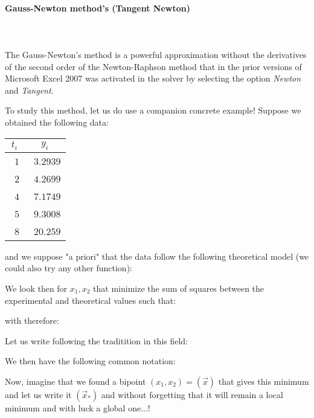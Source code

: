	\paragraph{Gauss-Newton method's (Tangent Newton)}\mbox{}\\\\
	The Gauss-Newton's method is a powerful approximation without the derivatives of the second order of the Newton-Raphson method that in the prior versions of Microsoft Excel 2007 was activated in the solver by selecting the option \textit{Newton} and \textit{Tangent}.

	To study this method, let us do use a companion concrete example! Suppose we obtained the following data:
	\begin{table}[H]
		\begin{center}
				\begin{tabular}{|p{2cm}|p{2cm}|}
					\hline
					\multicolumn{1}{c}{\cellcolor{black!30}$t_i$} & 
	  \multicolumn{1}{c}{\cellcolor{black!30}$y_i$}  \\ \hline
					\centering\arraybackslash\ $1$ & \centering\arraybackslash\ $3.2939$ \\ \hline	
					\centering\arraybackslash\ $2$ & \centering\arraybackslash\ $4.2699$ \\ \hline	
					\centering\arraybackslash\ $4$ & \centering\arraybackslash\ $7.1749$ \\ \hline	
					\centering\arraybackslash\ $5$ & \centering\arraybackslash\ $9.3008$ \\ \hline	
					\centering\arraybackslash\ $8$ & \centering\arraybackslash\ $20.259$ \\ \hline	
				\end{tabular}
		\end{center}
	\end{table}
	and we suppose "a priori" that the data follow the following theoretical model (we could also try any other function):
	 
	We look then for $x_1,x_2$ that minimize the sum of squares between the experimental and theoretical values such that:
	
	with therefore:
	
	Let us write following the traditition in this field:
	
	We then have the following common notation:
	
	Now, imagine that we found a bipoint $(x_1,x_2)=(\vec{x})$ that gives this minimum and let us write it $(\vec{x}_{*})$ and without forgetting that it will remain a local minimum and with luck a global one...! 

